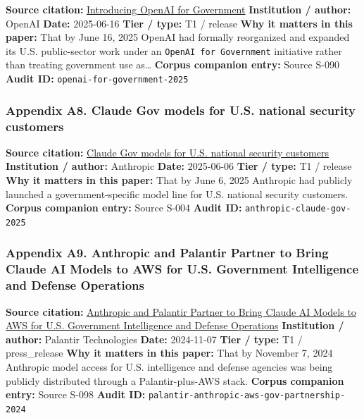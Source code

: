 \documentclass[
  american,
  11pt,
  letterpaper,
]{article}
\begin{document}
\textbf{Source citation:}
\href{https://openai.com/global-affairs/introducing-openai-for-government/}{Introducing
OpenAI for Government} \textbf{Institution / author:} OpenAI
\textbf{Date:} 2025-06-16 \textbf{Tier / type:} T1 / release \textbf{Why
it matters in this paper:} That by June 16, 2025 OpenAI had formally
reorganized and expanded its U.S. public-sector work under an
\texttt{OpenAI\ for\ Government} initiative rather than treating
government use as\ldots{} \textbf{Corpus companion entry:} Source S-090
\textbf{Audit ID:} \texttt{openai-for-government-2025}

\subsubsection{Appendix A8. Claude Gov models for U.S. national security
customers}\label{appendix-a8-claude-gov-models-for-u-s-national-security-customers}

\textbf{Source citation:}
\href{https://www.anthropic.com/news/claude-gov-models-for-u-s-national-security-customers}{Claude
Gov models for U.S. national security customers} \textbf{Institution /
author:} Anthropic \textbf{Date:} 2025-06-06 \textbf{Tier / type:} T1 /
release \textbf{Why it matters in this paper:} That by June 6, 2025
Anthropic had publicly launched a government-specific model line for
U.S. national security customers. \textbf{Corpus companion entry:}
Source S-004 \textbf{Audit ID:} \texttt{anthropic-claude-gov-2025}

\subsubsection{Appendix A9. Anthropic and Palantir Partner to Bring
Claude AI Models to AWS for U.S. Government Intelligence and Defense
Operations}\label{appendix-a9-anthropic-and-palantir-partner-to-bring-claude-ai-models-to-aws-for-u-s-government-intelligence-and-defense-operations}

\textbf{Source citation:}
\href{https://investors.palantir.com/news-details/2024/Anthropic-and-Palantir-Partner-to-Bring-Claude-AI-Models-to-AWS-for-U.S.-Government-Intelligence-and-Defense-Operations/}{Anthropic
and Palantir Partner to Bring Claude AI Models to AWS for U.S.
Government Intelligence and Defense Operations} \textbf{Institution /
author:} Palantir Technologies \textbf{Date:} 2024-11-07 \textbf{Tier /
type:} T1 / press\_release \textbf{Why it matters in this paper:} That
by November 7, 2024 Anthropic model access for U.S. intelligence and
defense agencies was being publicly distributed through a
Palantir-plus-AWS stack. \textbf{Corpus companion entry:} Source S-098
\textbf{Audit ID:} \texttt{palantir-anthropic-aws-gov-partnership-2024}
\end{document}
